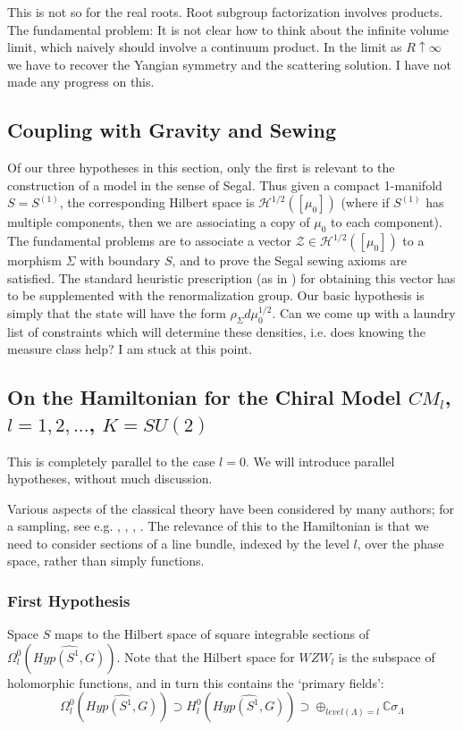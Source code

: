 \documentclass{amsart}
\theoremstyle{conjecture}
\theoremstyle{definition}
\theoremstyle{question}
\theoremstyle{questions}
\theoremstyle{remark}
\theoremstyle{remarks}
\theoremstyle{example}
\numberwithin{equation}{section}
\begin{document}
This is not so for the real roots. Root subgroup factorization involves products. The fundamental problem: It is not clear how to think about the infinite volume limit, which naively should
involve a continuum product. In the limit as $R\uparrow \infty$ we have to recover the Yangian symmetry and the scattering solution. I have not made any progress on this.

\subsection{Coupling with Gravity and Sewing}

Of our three hypotheses in this section, only the first is relevant to the construction of a model in the sense of Segal. Thus given a compact 1-manifold $S=S^{(1)}$, the corresponding Hilbert space is $\mathcal H^{1/2}([\mu_0])$ (where if $S^{(1)}$ has multiple components, then we are associating a copy of $\mu_0$ to each component).
The fundamental problems are to associate a vector $\mathcal Z\in \mathcal H^{1/2}([\mu_0])$ to a morphism $\Sigma$ with boundary $S$, and to prove the Segal sewing axioms are satisfied. The standard heuristic prescription (as in \cite{Pi2.5}) for obtaining this vector has to be supplemented with the renormalization group. 
Our basic hypothesis is simply that the state will have the form
$\rho_{\Sigma} d\mu_0^{1/2}$. Can we come up with a laundry list of constraints which will determine these densities, i.e. does knowing the measure class help?
I am stuck at this point.
 

\subsection{ On the Hamiltonian for the Chiral Model $CM_l$, $l=1,2,...$, $K=SU(2)$ }

This is completely parallel to the case $l=0$. We will introduce parallel hypotheses, without much discussion.

Various aspects of the classical theory have been considered by many authors; for a sampling, see e.g. \cite{AM}, \cite{Bernard}, \cite{Bernard1}, \cite{Uhlenbeck2}. The relevance of this to the Hamiltonian is that we need to consider sections of a line bundle, indexed by the level $l$, over the phase space, rather than simply functions.


\subsubsection{First Hypothesis} Space $S$ maps to the Hilbert space of square integrable sections
of $\Omega^0_l(\widehat{Hyp(S^1,G)})$. Note that the Hilbert space for $WZW_l$ is the subspace of holomorphic
functions, and in turn this contains the `primary fields':
$$ \Omega^0_l(\widehat{Hyp(S^1,G)})\supset H^0_l(\widehat{Hyp(S^1,G)}) \supset \oplus_{level(\Lambda)=l}\mathbb C \sigma_{\Lambda}$$
\end{document}
